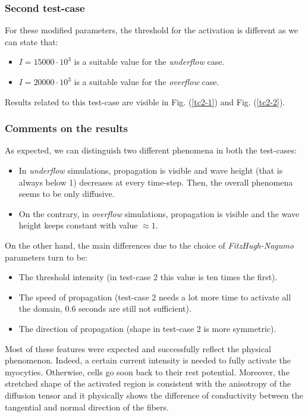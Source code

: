 \documentclass[a4paper,11pt]{article}
\begin{document}
\subsubsection{Second test-case}
For these modified parameters, the threshold for the activation is different as we can state that:
\begin{itemize}
	\item $I = 15000 \cdot 10^3 $ is a suitable value for the \emph{underflow} case.
	\item $I = 20000 \cdot 10^3 $ is a suitable value for the \emph{overflow} case.
\end{itemize}

\noindent Results related to this test-case are visible in Fig. (\ref{tc2-1}) and Fig. (\ref{tc2-2}).

\subsubsection{Comments on the results}
As expected, we can distinguish two different phenomena in both the test-cases:
\begin{itemize}
	\item In \emph{underflow} simulations, propagation is visible and wave height (that is always below 1) decreases at every time-step. Then, the overall phenomena seems to be only diffusive.
	\item On the contrary, in \emph{overflow} simulations, propagation is visible and the wave height keeps constant with value $\approx 1$.  
\end{itemize}

\noindent On the other hand, the main differences due to the choice of \emph{FitzHugh-Nagumo} parameters turn to be:
\begin{itemize}
	\item The threshold intensity (in test-case 2 this value is ten times the first).
	\item The speed of propagation (test-case 2 needs a lot more time to activate all the domain, 0.6 seconds are still not sufficient).
	\item The direction of propagation (shape in test-case 2 is more symmetric).
\end{itemize}
 
\noindent Most of these features were expected and successfully reflect the physical phenomenon. Indeed, a certain current intensity is needed to fully activate the myocyties. Otherwise, cells go soon back to their rest potential. Moreover, the stretched shape of the activated region is consistent with the anisotropy of the diffusion tensor and it physically shows the difference of conductivity between the tangential and normal direction of the fibers.\\
\end{document}
